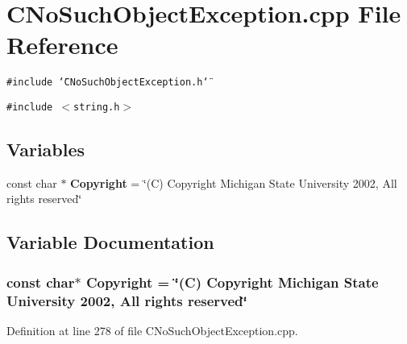 \section{CNo\-Such\-Object\-Exception.cpp File Reference}
\label{CNoSuchObjectException_8cpp}
{\tt \#include \char`\"{}CNo\-Such\-Object\-Exception.h\char`\"{}}\par
{\tt \#include $<$string.h$>$}\par
\subsection*{Variables}
\begin{CompactItemize}
\item 
const char $\ast$ {\bf Copyright} = \char`\"{}(C) Copyright Michigan State University 2002, All rights reserved\char`\"{}
\end{CompactItemize}


\subsection{Variable Documentation}
\subsubsection{\setlength{\rightskip}{0pt plus 5cm}const char$\ast$ Copyright = \char`\"{}(C) Copyright Michigan State University 2002, All rights reserved\char`\"{}\hspace{0.3cm}{\tt  [static]}}\label{CNoSuchObjectException_8cpp_a0}




Definition at line 278 of file CNo\-Such\-Object\-Exception.cpp.